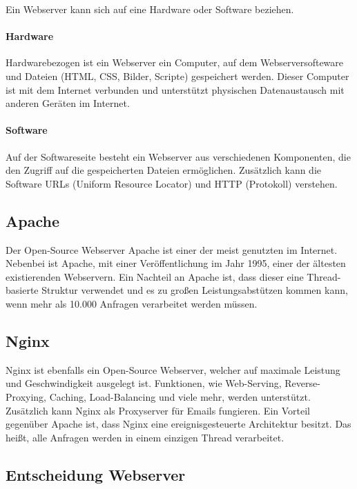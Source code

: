 Ein Webserver\cite{Webservers} kann sich auf eine Hardware oder Software beziehen. 

\paragraph{Hardware} Hardwarebezogen ist ein Webserver ein Computer, auf dem Webserversofteware und Dateien (HTML, CSS, Bilder, Scripte) gespeichert werden. Dieser Computer ist mit dem Internet verbunden und unterstützt physischen Datenaustausch mit anderen Geräten im Internet.

\paragraph{Software} Auf der Softwareseite besteht ein Webserver aus verschiedenen Komponenten, die den Zugriff auf die gespeicherten Dateien ermöglichen. Zusätzlich kann die Software URLs (Uniform Resource Locator) und HTTP (Protokoll) verstehen.

\subsection{Apache}

Der Open-Source Webserver Apache\cite{Apache} ist einer der meist genutzten im Internet. Nebenbei ist Apache, mit einer Veröffentlichung im Jahr 1995, einer der ältesten existierenden Webservern. Ein Nachteil an Apache ist, dass dieser eine Thread-basierte Struktur verwendet und es zu großen Leistungsabstützen kommen kann, wenn mehr als 10.000 Anfragen verarbeitet werden müssen.

\subsection{Nginx}

Nginx\cite{Nginx} ist ebenfalls ein Open-Source Webserver, welcher auf maximale Leistung und Geschwindigkeit ausgelegt ist. Funktionen, wie Web-Serving, Reverse-Proxying, Caching, Load-Balancing und viele mehr, werden unterstützt. Zusätzlich kann Nginx als Proxyserver für Emails fungieren. Ein Vorteil gegenüber Apache ist, dass Nginx eine ereignisgesteuerte Architektur besitzt. Das heißt, alle Anfragen werden in einem einzigen Thread verarbeitet.

\subsection{Entscheidung Webserver}

